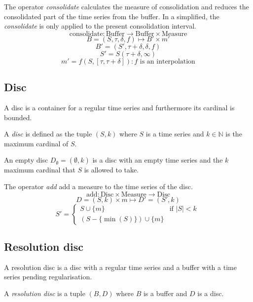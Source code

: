 \begin{definition}
  The operator \emph{consolidate} calculates the measure of
  consolidation and reduces the consolidated part of the time series
  from the buffer. In a simplified, the \emph{consolidate} is only
  applied to the present consolidation interval.
  \[
  \text{consolidate}: \text{Buffer} \longrightarrow \text{Buffer}
  \times \text{Measure}
  \]
  \[
  B=(S,\tau,\delta,f) \mapsto B' \times m'
  \]
  \[
  B'= (S',\tau+\delta,\delta,f)
  \]
  \[
  S' = S(\tau+\delta,\infty)
  \]
  \[
  m' = f(S,[\tau,\tau+\delta]): f \text{ is an interpolation}
  \]
\end{definition}



\subsection{Disc}\label{sec:model:disc}

A disc is a container for a regular time series and furthermore its
cardinal is bounded. 

\begin{definition}[Disc]
  A \emph{disc} is defined as the tuple $(S,k)$ where $S$ is a time
  series and $k\in\mathbb{N}$ is the maximum cardinal of $S$.
\end{definition}

An empty disc $D_{\emptyset} = (\emptyset,k)$ is a disc with an empty
time series and the $k$ maximum cardinal that $S$ is allowed to take.

\begin{definition}
  The operator \emph{add} add a measure to the time series of the disc.
  \[
  \text{add}: \text{Disc} \times \text{Measure} \longrightarrow \text{Disc}
  \]
  \[
  D=(S,k) \times m \mapsto D'= (S',k)
  \]
  \[
  S' =  
  \begin{cases}
      S\cup\{m\} &\text{if }  |S|<k\\
      (S-\{\min(S)\}) \cup \{m\} 
    \end{cases}  \
  \]
\end{definition}


\subsection{Resolution disc}

A resolution disc is a disc with a regular time series and a buffer
with a time series pending regularisation.

\begin{definition}
  A \emph{resolution disc} is a tuple $(B,D)$ where $B$
  is a buffer and $D$ is a disc.
\end{definition}
 

